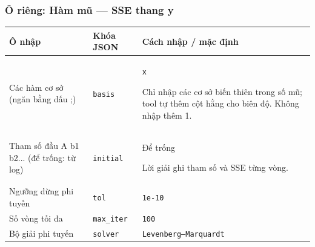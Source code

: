 \subsubsection*{Ô riêng: Hàm mũ — SSE thang y}
\begin{center}\small\begin{tabular}{@{}p{.32\linewidth}p{.17\linewidth}p{.43\linewidth}@{}}\toprule
Ô nhập & Khóa JSON & Cách nhập / mặc định\\\midrule
Các hàm cơ sở (ngăn bằng dấu ;\allowbreak{}) & \texttt{basis} & \texttt{x}
\par Chỉ nhập các cơ sở biến thiên trong số mũ;\allowbreak{} tool tự thêm cột hằng cho biên độ. Không nhập thêm 1.\\[3pt]
Tham số đầu A b1 b2... (để trống: từ log) & \texttt{initial} & Để trống
\par Lời giải ghi tham số và SSE từng vòng.\\[3pt]
Ngưỡng dừng phi tuyến & \texttt{tol} & \texttt{1e-10}\\[3pt]
Số vòng tối đa & \texttt{max\_iter} & \texttt{100}\\[3pt]
Bộ giải phi tuyến & \texttt{solver} & \texttt{Levenberg–Marquardt}\\[3pt]
\bottomrule\end{tabular}\end{center}
